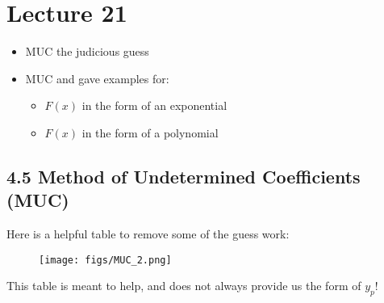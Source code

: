 \chapter*{Lecture 21}
\begin{recall}{}{}
\begin{itemize}
\item MUC the judicious guess
\item MUC and gave examples for:
\begin{itemize}
\item $F(x)$ in the form of an exponential
\item $F(x)$ in the form of a polynomial
\end{itemize}

\end{itemize}
\end{recall}






\section*{4.5 Method of Undetermined Coefficients (MUC)}
Here is a helpful table to remove some of the guess work:
\begin{figure}[h!]
\texttt{[image: figs/MUC\_2.png]} 
\end{figure}
This table is meant to help, and does not always provide us the form of $y_p$!

